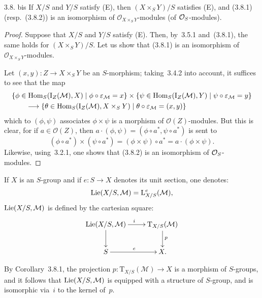 \begin{proposition}{3.8. bis}\label{II.3.8.bis}
If \(X/S\) and \(Y/S\) satisfy \textup{(E)}, then \((X\times_{S}Y)/S\) satisfies
\textup{(E)}, and \textup{(3.8.1)} (resp.\ \textup{(3.8.2)}) is an isomorphism
of \(\mathcal{O}_{X\times_{S}Y}\)-modules (\resp of \(\mathcal{O}_S\)-modules).
\end{proposition}

\begin{proof}%
{\renewcommand{\thefootnote}{(29)}}
Suppose that \(X/S\) and \(Y/S\) satisfy \textup{(E)}. Then, by~3.5.1
and~\textup{(3.8.1)}, the same holds for \((X\times_{S}Y)/S\). Let us show
that \textup{(3.8.1)} is an isomorphism of
\(\mathcal{O}_{X\times_{S}Y}\)-modules.

Let \((x,y)\colon Z\to X\times_{S}Y\) be an \(S\)-morphism; taking~3.4.2 into
account, it suffices to see that the map
\[
\begin{aligned}
&\{\phi\in\operatorname{Hom}_{S}(\mathrm{I}_{Z}(\mathcal{M}),X)
\mid \phi\circ\varepsilon_{\mathcal{M}}=x\}
\times
\{\psi\in\operatorname{Hom}_{S}(\mathrm{I}_{Z}(\mathcal{M}),Y)
\mid \psi\circ\varepsilon_{\mathcal{M}}=y\}\\
&\qquad\longrightarrow
\{\theta\in\operatorname{Hom}_{S}(\mathrm{I}_{Z}(\mathcal{M}),X\times_{S}Y)
\mid \theta\circ\varepsilon_{\mathcal{M}}=(x,y)\}
\end{aligned}
\]
which to \((\phi,\psi)\) associates \(\phi\times\psi\) is a morphism of
\(\mathcal{O}(Z)\)-modules. But this is clear, for if
\(a\in\mathcal{O}(Z)\), then
\(a\cdot(\phi,\psi)=(\phi\circ a^{*},\psi\circ a^{*})\) is sent to
\[
(\phi\circ a^{*})\times(\psi\circ a^{*})
=(\phi\times\psi)\circ a^{*}
=a\cdot(\phi\times\psi).
\]
Likewise, using~3.2.1, one shows that \textup{(3.8.2)} is an isomorphism of
\(\mathcal{O}_S\)-modules.
\end{proof}

\label{II.3.9.0}%
{\renewcommand{\thefootnote}{(30)}}
If \(X\) is an \(S\)-group and if \(e\colon S\to X\) denotes its unit section,
one denotes:
\[
\operatorname{Lie}(X/S,\mathcal{M})=\mathrm{L}^{e}_{X/S}(\mathcal{M}),
\]
\ie \(\operatorname{Lie}(X/S,\mathcal{M})\) is defined by the cartesian square:
\[
\xymatrix{
\Lie(X/S,\mathcal{M})\ar[r]^{i}\ar[d]
& \mathrm{T}_{X/S}(\mathcal{M})\ar[d]^{p}\\
S\ar[r]^{e}
& X.
}
\]

By Corollary~3.8.1, the projection
\(p\colon\mathrm{T}_{X/S}(\mathcal{M})\to X\) is a morphism of \(S\)-groups, and
it follows that \(\operatorname{Lie}(X/S,\mathcal{M})\) is equipped with a structure of
\(S\)-group, and is isomorphic via~\(i\) to the kernel of~\(p\).

